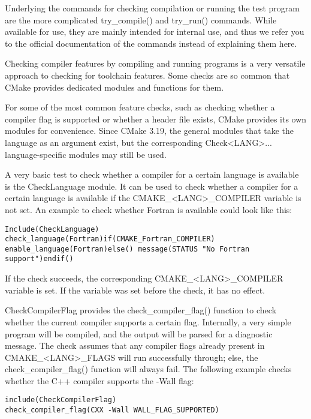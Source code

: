 Underlying the commands for checking compilation or running the test program are the more complicated try\_compile() and try\_run() commands. While available for use, they are mainly intended for internal use, and thus we refer you to the official documentation of the commands instead of explaining them here.

Checking compiler features by compiling and running programs is a very versatile approach to checking for toolchain features. Some checks are so common that CMake provides dedicated modules and functions for them.


For some of the most common feature checks, such as checking whether a compiler flag is supported or whether a header file exists, CMake provides its own modules for convenience. Since CMake 3.19, the general modules that take the language as an argument exist, but the corresponding Check<LANG>... language-specific modules may still be used.

A very basic test to check whether a compiler for a certain language is available is the CheckLanguage module. It can be used to check whether a compiler for a certain language is available if the CMAKE\_<LANG>\_COMPILER variable is not set. An example to check whether Fortran is available could look like this:

\begin{lstlisting}[style=styleCMake]
Include(CheckLanguage)
check_language(Fortran)if(CMAKE_Fortran_COMPILER)
enable_language(Fortran)else() message(STATUS "No Fortran
support")endif()
\end{lstlisting}

If the check succeeds, the corresponding CMAKE\_<LANG>\_COMPILER variable is set. If the variable was set before the check, it has no effect.

CheckCompilerFlag provides the check\_compiler\_flag() function to check whether the current compiler supports a certain flag. Internally, a very simple program will be compiled, and the output will be parsed for a diagnostic message. The check assumes that any compiler flags already present in CMAKE\_<LANG>\_FLAGS will run successfully through; else, the check\_compiler\_flag() function will always fail. The following example checks whether the C++ compiler supports the -Wall flag:

\begin{lstlisting}[style=styleCMake]
include(CheckCompilerFlag)
check_compiler_flag(CXX -Wall WALL_FLAG_SUPPORTED)
\end{lstlisting}

